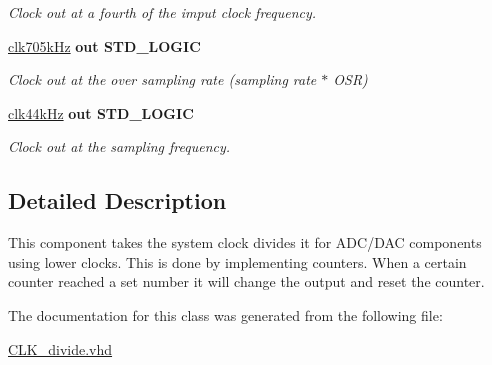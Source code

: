 \begin{DoxyCompactItemize}
\begin{DoxyCompactList}\small\item\em Clock out at a fourth of the imput clock frequency. \end{DoxyCompactList}\item 
\hypertarget{classclk__divide_aff53844dd015a736d734149d187ffa1d}{\hyperlink{classclk__divide_aff53844dd015a736d734149d187ffa1d}{clk705k\-Hz}  {\bfseries {\bfseries \textcolor{vhdlkeyword}{out}\textcolor{vhdlchar}{ }}} {\bfseries \textcolor{comment}{S\-T\-D\-\_\-\-L\-O\-G\-I\-C}\textcolor{vhdlchar}{ }} }\label{classclk__divide_aff53844dd015a736d734149d187ffa1d}

\begin{DoxyCompactList}\small\item\em Clock out at the over sampling rate (sampling rate $\ast$ O\-S\-R) \end{DoxyCompactList}\item 
\hypertarget{classclk__divide_ab41cd6e2d38ae8f4a3b6bc0891225629}{\hyperlink{classclk__divide_ab41cd6e2d38ae8f4a3b6bc0891225629}{clk44k\-Hz}  {\bfseries {\bfseries \textcolor{vhdlkeyword}{out}\textcolor{vhdlchar}{ }}} {\bfseries \textcolor{comment}{S\-T\-D\-\_\-\-L\-O\-G\-I\-C}\textcolor{vhdlchar}{ }} }\label{classclk__divide_ab41cd6e2d38ae8f4a3b6bc0891225629}

\begin{DoxyCompactList}\small\item\em Clock out at the sampling frequency. \end{DoxyCompactList}\end{DoxyCompactItemize}


\subsection{Detailed Description}
This component takes the system clock divides it for A\-D\-C/\-D\-A\-C components using lower clocks. This is done by implementing counters. When a certain counter reached a set number it will change the output and reset the counter. 

The documentation for this class was generated from the following file\-:\begin{DoxyCompactItemize}
\item 
\hyperlink{CLK__divide_8vhd}{C\-L\-K\-\_\-divide.\-vhd}\end{DoxyCompactItemize}
